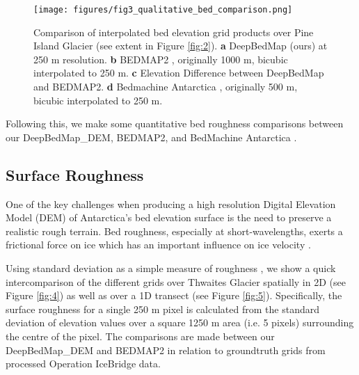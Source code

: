 \documentclass[tc, manuscript]{copernicus}
\begin{document}
\begin{figure}[ht]
  \texttt{[image: figures/fig3\_qualitative\_bed\_comparison.png]}
  \caption{
    Comparison of interpolated bed elevation grid products over Pine Island Glacier (see extent in Figure \ref{fig:2}).
    \textbf{a} DeepBedMap (ours) at 250 m resolution.
    \textbf{b} BEDMAP2 \citep{FretwellBedmap2improvedice2013}, originally 1000 m, bicubic interpolated to 250 m.
    \textbf{c} Elevation Difference between DeepBedMap and BEDMAP2.
    \textbf{d} Bedmachine Antarctica \citep{MorlighemMEaSUREsBedMachineAntarctica2019}, originally 500 m, bicubic interpolated to 250 m.
  }
  \label{fig:3}
\end{figure}

Following this, we make some quantitative bed roughness comparisons between our DeepBedMap\_DEM, BEDMAP2, and BedMachine Antarctica \citep{MorlighemMEaSUREsBedMachineAntarctica2019}.

\subsection{Surface Roughness}

One of the key challenges when producing a high resolution Digital Elevation Model (DEM) of Antarctica's bed elevation surface is the need to preserve a realistic rough terrain.
Bed roughness, especially at short-wavelengths, exerts a frictional force on ice which has an important influence on ice velocity \citep{BinghamDiverselandscapesPine2017,FalciniQuantifyingbedroughness2018}.

Using standard deviation as a simple measure of roughness \citep{RippinBasalroughnessInstitute2014}, we show a quick intercomparison of the different grids over Thwaites Glacier spatially in 2D (see Figure \ref{fig:4}) as well as over a 1D transect (see Figure \ref{fig:5}).
Specifically, the surface roughness for a single 250 m pixel is calculated from the standard deviation of elevation values over a square 1250 m area (i.e. 5 pixels) surrounding the centre of the pixel.
The comparisons are made between our DeepBedMap\_DEM and BEDMAP2 in relation to groundtruth grids from processed Operation IceBridge data.
\end{document}
